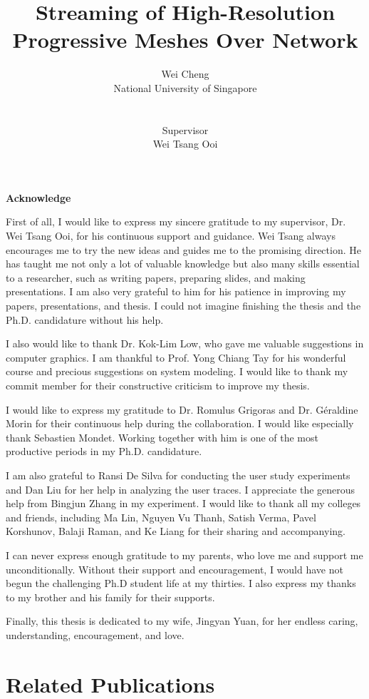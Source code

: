 \documentclass[11pt, a4paper]{report}
\title{Streaming of High-Resolution Progressive Meshes Over Network}
\author{Wei Cheng\\
National University of Singapore\\
\\
\\
Supervisor\\
Wei Tsang Ooi}
\newcommand\acknowledgename{Acknowledge}
\newenvironment{acknowledge}%
    {\cleardoublepage \null \vfill
    \begin{center}%
         \bfseries \acknowledgename
    \end{center}}%
    {\vfill \null}
\begin{document}
\maketitle
\doublespacing
{}
   
\begin{acknowledge}
    First of all, I would like to express my sincere gratitude to my supervisor, Dr. Wei Tsang Ooi, for his continuous support and guidance. 
    Wei Tsang always encourages me to try the new ideas and guides me to the promising direction. He has taught me not only a lot of valuable knowledge
    but also many skills essential to a researcher, such as writing papers, preparing slides, and making presentations. 
    I am also very grateful to him for his patience in improving my papers, presentations, and thesis. 
    I could not imagine finishing the thesis and the Ph.D. candidature without his help.

    I also would like to thank Dr. Kok-Lim Low, who gave me valuable suggestions in computer graphics. I am thankful to Prof. Yong Chiang Tay for his
    wonderful course and precious suggestions on system modeling. I would like to thank my commit member for their constructive criticism to improve my thesis.

    I would like to express my gratitude to Dr. Romulus Grigoras and Dr. G\'{e}raldine Morin for their continuous help during the collaboration. I would
    like especially thank Sebastien Mondet. Working together with him is one of the most productive periods in my Ph.D. candidature. 

    I am also grateful to Ransi De Silva for conducting the user study experiments and Dan Liu for her help in analyzing the user traces.
    I appreciate the generous help from Bingjun Zhang in my experiment. 
    I would like to thank all my colleges and friends, including Ma Lin, Nguyen Vu Thanh, Satish Verma, Pavel Korshunov, Balaji Raman, and Ke Liang for their
    sharing and accompanying.

    I can never express enough gratitude to my parents, who love me and support me unconditionally. Without their support and encouragement, I would have not
    begun the challenging Ph.D student life at my thirties. I also express my thanks to my brother and his family for their supports. 
    
    Finally, this thesis is dedicated to my wife, Jingyan Yuan, for her endless caring, understanding, encouragement, and love.

\end{acknowledge}
\tableofcontents
\listoffigures
\listoftables







\appendix
\chapter{Related Publications}



\end{document}
